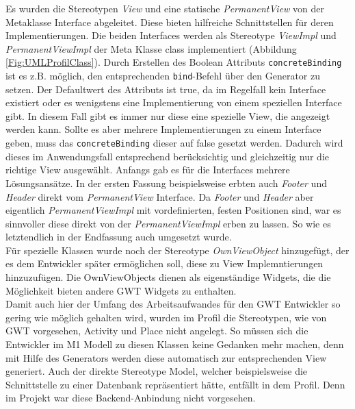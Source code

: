Es wurden die Stereotypen \textit{View} und eine statische \textit{PermanentView} von der Metaklasse Interface abgeleitet. Diese bieten hilfreiche Schnittstellen für deren Implementierungen. Die beiden Interfaces werden als Stereotype \textit{ViewImpl} und \textit{PermanentViewImpl} der Meta Klasse class implementiert (Abbildung \ref{Fig:UMLProfilClass}). Durch Erstellen des Boolean Attributs \texttt{concreteBinding} ist es z.B. möglich, den entsprechenden \texttt{bind}-Befehl über den Generator zu setzen. Der Defaultwert des Attributs ist true, da im Regelfall kein Interface existiert oder es wenigstens eine Implementierung von einem speziellen Interface gibt. In diesem Fall gibt es immer nur diese eine spezielle View, die angezeigt werden kann. Sollte es aber mehrere Implementierungen zu einem Interface geben, muss das \texttt{concreteBinding} dieser auf false gesetzt werden. Dadurch wird dieses im Anwendungsfall entsprechend berücksichtig und gleichzeitig nur die richtige View ausgewählt.
Anfangs gab es für die Interfaces mehrere Lösungsansätze. In der ersten Fassung beispielsweise erbten auch \textit{Footer} und \textit{Header} direkt vom \textit{PermanentView} Interface. Da \textit{Footer} und \textit{Header} aber eigentlich \textit{PermanentViewImpl} mit vordefinierten, festen Positionen sind, war es sinnvoller diese direkt von der \textit{PermanentViewImpl} erben zu lassen. So wie es letztendlich in der Endfassung auch umgesetzt wurde.\\

Für spezielle Klassen wurde noch der Stereotype \textit{OwnViewObject} hinzugefügt, der es dem Entwickler später ermöglichen soll, diese zu View Implemntierungen hinzuzufügen. Die OwnViewObjects dienen als eigenständige Widgets, die die Möglichkeit bieten andere GWT Widgets zu enthalten. \\

Damit auch hier der Umfang des Arbeitsaufwandes für den GWT Entwickler so gering wie möglich gehalten wird, wurden im Profil die Stereotypen, wie von GWT vorgesehen, Activity und Place nicht angelegt. So müssen sich die Entwickler im M1 Modell zu diesen Klassen keine Gedanken mehr machen, denn mit Hilfe des Generators werden diese automatisch zur entsprechenden View generiert. Auch der direkte Stereotype Model, welcher beispielsweise die Schnittstelle zu einer Datenbank repräsentiert hätte, entfällt in dem Profil. Denn im Projekt war diese Backend-Anbindung nicht vorgesehen.